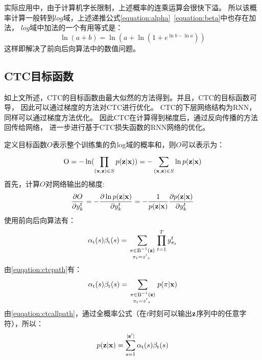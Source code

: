 实际应用中，由于计算机字长限制，上述概率的连乘运算会很快下溢。
所以该概率计算一般转到$log$域，上述递推公式\ref{equation:alpha}~\ref{equation:beta}中也存在加法，
$log$域中加法的一个有用等式是：
\begin{equation}
\ln (a + b) = \ln (a + \ln (1 + {e^{\ln b - \ln a}}))
\end{equation}
这样即解决了前向后向算法中的数值问题。

\subsection{CTC目标函数}

如上文所述，CTC的目标函数由最大似然的方法得到。并且，CTC的目标函数可导，
因此可以通过梯度的方法对CTC进行优化。
CTC的下层网络结构为RNN，同样可以通过梯度方法优化。
因此CTC在计算得到梯度后，通过反向传播的方法回传给网络，
进一步进行基于CTC损失函数的RNN网络的优化。

定义目标函数$O$表示整个训练集的负log域的概率和，则$O$可以表示为：
\begin{equation}
{\rm{O}} =  - \ln (\prod\limits_{({\bf{x}},{\bf{z}}) \in S} {p({\bf{z}}|{\bf{x}})} ) =  - \sum\limits_{({\bf{x}},{\bf{z}}) \in S}^{} {\ln p({\bf{z}}|{\bf{x}})}
\end{equation}
首先，计算$O$对网络输出的梯度:
\begin{equation}
\label{equation:o}
\frac{{\partial O}}{{\partial y_k^t}} =  - \frac{{\partial \ln p({\bf{z}}|{\bf{x}})}}{{\partial y_k^t}} =  - \frac{1}{{p({\bf{z}}|{\bf{x}})}}\frac{{\partial p({\bf{z}}|{\bf{x}})}}{{\partial y_k^t}}
\end{equation}
使用前向后向算法有：
\begin{equation}
{\alpha _{\rm{t}}}(s){\beta _{\rm{t}}}(s) = \sum\limits_{\scriptstyle\pi  \in {{\rm B}^{ - 1}}({\bf{z}})\hfill\atop
\scriptstyle{\kern 1pt} {\kern 1pt} {\kern 1pt} {\kern 1pt} {\pi _t} = {{z'}_s}\hfill} {\prod\limits_{t = 1}^T {y_{{\pi _t}}^t} }
\end{equation}
由\ref{euqation:ctcpath}有：
\begin{equation}
{\alpha _{\rm{t}}}(s){\beta _{\rm{t}}}(s) = \sum\limits_{\scriptstyle\pi  \in {{\rm B}^{ - 1}}({\bf{z}})\hfill\atop
\scriptstyle{\kern 1pt} {\kern 1pt} {\kern 1pt} {\kern 1pt} {\pi _t} = {{z'}_s}\hfill} {p(} \pi |{\bf{x}})
\end{equation}
由\ref{euqation:ctcallpath}，通过全概率公式（在$t$时刻可以输出${\bf{z}}$序列中的任意字符），所以：
\begin{equation}
\label{equation:alls}
p({\bf{z}}|{\bf{x}}) = \sum\limits_{s = 1}^{|{\bf{z'}}|} {{\alpha _{\rm{t}}}(s){\beta _{\rm{t}}}(s)}
\end{equation}

